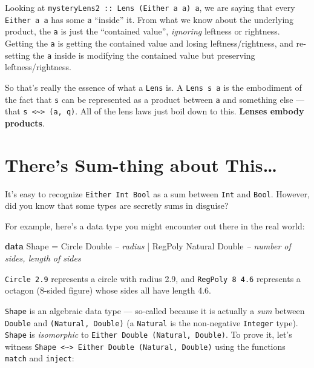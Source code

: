 \documentclass[]{article}
\newenvironment{Shaded}{}{}
\newcommand{\CommentTok}[1]{\textcolor[rgb]{0.38,0.63,0.69}{\textit{#1}}}
\newcommand{\DataTypeTok}[1]{\textcolor[rgb]{0.56,0.13,0.00}{#1}}
\newcommand{\FunctionTok}[1]{\textcolor[rgb]{0.02,0.16,0.49}{#1}}
\newcommand{\KeywordTok}[1]{\textcolor[rgb]{0.00,0.44,0.13}{\textbf{#1}}}
\begin{document}
Looking at \texttt{mysteryLens2\ ::\ Lens\textquotesingle{}\ (Either\ a\ a)\ a},
we are saying that every \texttt{Either\ a\ a} has some \texttt{a} ``inside''
it. From what we know about the underlying product, the \texttt{a} is just the
``contained value'', \emph{ignoring} leftness or rightness. Getting the
\texttt{a} is getting the contained value and losing leftness/rightness, and
re-setting the \texttt{a} inside is modifying the contained value but preserving
leftness/rightness.

So that's really the essence of what a \texttt{Lens\textquotesingle{}} is. A
\texttt{Lens\textquotesingle{}\ s\ a} is the embodiment of the fact that
\texttt{s} can be represented as a product between \texttt{a} and something else
--- that \texttt{s\ \textless{}\textasciitilde{}\textgreater{}\ (a,\ q)}. All of
the lens laws just boil down to this. \textbf{Lenses embody products}.

\hypertarget{theres-sum-thing-about-this}{%
\section{There's Sum-thing about
This\ldots{}}\label{theres-sum-thing-about-this}}

It's easy to recognize \texttt{Either\ Int\ Bool} as a sum between \texttt{Int}
and \texttt{Bool}. However, did you know that some types are secretly sums in
disguise?

For example, here's a data type you might encounter out there in the real world:

\begin{Shaded}
\begin{Highlighting}[]
\KeywordTok{data} \DataTypeTok{Shape} \FunctionTok{=} \DataTypeTok{Circle}  \DataTypeTok{Double}           \CommentTok{-- radius}
           \FunctionTok{|} \DataTypeTok{RegPoly} \DataTypeTok{Natural} \DataTypeTok{Double}   \CommentTok{-- number of sides, length of sides}
\end{Highlighting}
\end{Shaded}

\texttt{Circle\ 2.9} represents a circle with radius 2.9, and
\texttt{RegPoly\ 8\ 4.6} represents a octagon (8-sided figure) whose sides all
have length 4.6.

\texttt{Shape} is an algebraic data type --- so-called because it is actually a
\emph{sum} between \texttt{Double} and \texttt{(Natural,\ Double)} (a
\texttt{Natural} is the non-negative \texttt{Integer} type). \texttt{Shape} is
\emph{isomorphic} to \texttt{Either\ Double\ (Natural,\ Double)}. To prove it,
let's witness
\texttt{Shape\ \textless{}\textasciitilde{}\textgreater{}\ Either\ Double\ (Natural,\ Double)}
using the functions \texttt{match} and \texttt{inject}:
\end{document}
